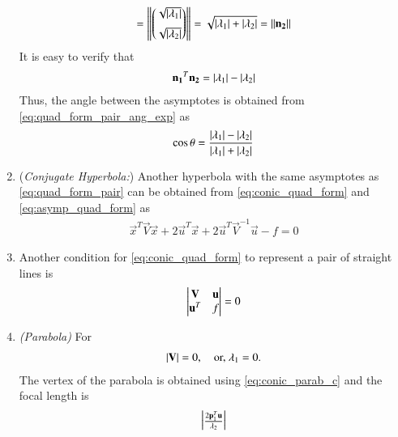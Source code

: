 \begin{enumerate}[label=\thesubsection.\arabic*.,ref=\thesubsection.\theenumi]
\begin{align}
=\left\lVert\begin{pmatrix}\sqrt{\left\vert\lambda_1\right\vert} \\[2mm]  \sqrt{\left\vert\lambda_2\right\vert}\end{pmatrix}\right\rVert
=\sqrt{\left\vert\lambda_1\right\vert+\left\vert\lambda_2\right\vert} = \left\lVert\mathbf{n_2}\right\rVert
\end{align} 
It is easy to verify that 
\begin{align} 
\mathbf{n_1}^T\mathbf{n_2} = \left\vert\lambda_1\right\vert-\left\vert\lambda_2\right\vert
\end{align} 
%
Thus, the angle between the asymptotes is obtained from \eqref{eq:quad_form_pair_ang_exp} as
\begin{align} 
\label{eq:quad_form_pair_ang}
\cos\theta=\frac{\left\vert\lambda_1\right\vert-\left\vert\lambda_2\right\vert}
{\left\vert\lambda_1\right\vert+\left\vert\lambda_2\right\vert}
\end{align} 
\item ({\em Conjugate Hyperbola:}) Another hyperbola with the same asymptotes as \eqref{eq:quad_form_pair} can be obtained from \eqref{eq:conic_quad_form} and \eqref{eq:asymp_quad_form} as
\begin{align}
\label{eq:hyper_conj_quad_form}
\vec{x}^T\vec{V}\vec{x}+2\vec{u}^T\vec{x}+2\vec{u}^T\vec{V}^{-1}\vec{u}-f=0
\end{align}
%
\item 
Another condition for \eqref{eq:conic_quad_form} to represent a pair of straight lines is
\begin{align}
\begin{vmatrix}
\mathbf{V}&\mathbf{u}
\\
\mathbf{u}^T&f
\end{vmatrix}
= 0
\label{eq:quad_forms_pair_det}
\end{align}
%


\item {\em (Parabola)} For \begin{align} \left\vert\mathbf{V}\right\vert 
= 0, \quad \text{or, } \lambda_1 = 0. \end{align}
The vertex of the parabola  is  obtained using \eqref{eq:conic_parab_c} and the focal length is 
\begin{align}
\begin{vmatrix}\frac{2\mathbf{p}_1^T\mathbf{u}}{\lambda_2}\end{vmatrix}
\end{align}

\end{enumerate}

